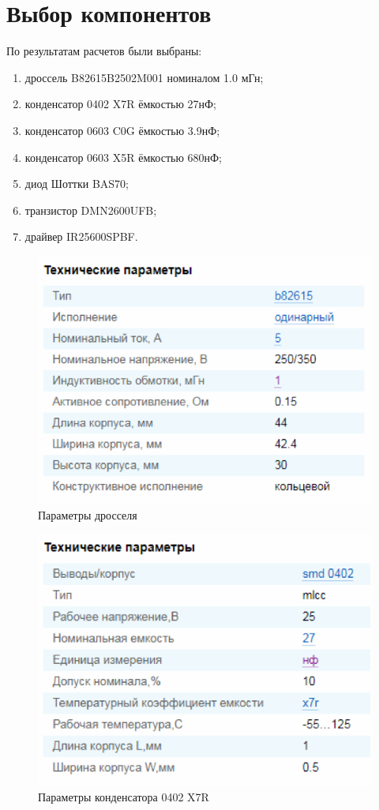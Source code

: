 \chapter{Выбор компонентов}

По результатам расчетов были выбраны:
\begin{enumerate}
	\item дроссель B82615B2502M001 номиналом 1.0 мГн;
	\item конденсатор 0402 X7R ёмкостью 27нФ;
	\item конденсатор 0603 C0G ёмкостью 3.9нФ;
	\item конденсатор 0603 X5R ёмкостью 680нФ;
	\item диод Шоттки BAS70;
	\item транзистор DMN2600UFB;
	\item драйвер IR25600SPBF.
\end{enumerate}



\begin{figure}
	\centering
	\caption{Параметры дросселя}
	\includegraphics{images/1.png}
\end{figure}

\begin{figure}
	\centering
	\caption{Параметры конденсатора 0402 X7R}
	\includegraphics{images/2.png}
\end{figure}

